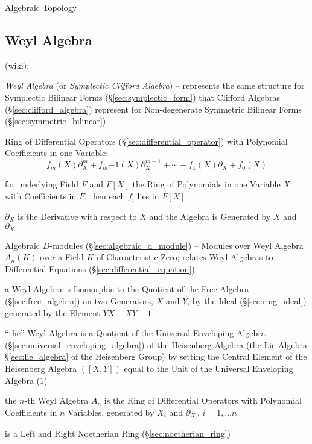 {{Algebraic Topology



\subsection{Weyl Algebra}\label{sec:weyl_algebra}

(wiki):

\emph{Weyl Algebra} (or \emph{Symplectic Clifford Algebra}) -- represents the
same structure for Symplectic Bilinear Forms (\S\ref{sec:symplectic_form}) that
Clifford Algebras (\S\ref{sec:clifford_algebra}) represent for Non-degenerate
Symmetric Bilinear Forms (\S\ref{sec:symmetric_bilinear})

Ring of Differential Operators (\S\ref{sec:differential_operator}) with
Polynomial Coefficients in one Variable:
\[
  f_m(X)\partial^m_X + f_m{-1}(X)\partial^{m-1}_X + \cdots +
  f_1(X)\partial_X + f_0(X)
\]

for underlying Field $F$ and $F[X]$ the Ring of Polynomials in one Variable $X$
with Coefficients in $F$, then each $f_i$ lies in $F[X]$

$\partial_X$ is the Derivative with respect to $X$ and the Algebra is Generated
by $X$ and $\partial_X$

\fist Algebraic $D$-modules (\S\ref{sec:algebraic_d_module}) -- Modules over
Weyl Algebra $A_n(K)$ over a Field $K$ of Characteristic Zero; relates Weyl
Algebras to Differential Equations (\S\ref{sec:differential_equation})

a Weyl Algebra is Isomorphic to the Quotient of the Free Algebra
(\S\ref{sec:free_algebra}) on two Generators, $X$ and $Y$, by the Ideal
(\S\ref{sec:ring_ideal}) generated by the Element $YX - XY - 1$

``the'' Weyl Algebra is a Quotient of the Universal Enveloping Algebra
(\S\ref{sec:universal_enveloping_algebra}) of the Heisenberg Algebra (the Lie
Algebra \S\ref{sec:lie_algebra} of the Heisenberg Group) by setting the Central
Element of the Heisenberg Algebra $([X,Y])$ equal to the Unit of the Universal
Enveloping Algebra ($1$)

the $n$-th Weyl Algebra $A_n$ is the Ring of Differential Operators with
Polynomial Coefficients in $n$ Variables, generated by $X_i$ and
$\partial_{X_i}$, $i = 1, \ldots n$

is a Left and Right Noetherian Ring (\S\ref{sec:noetherian_ring})

}}
